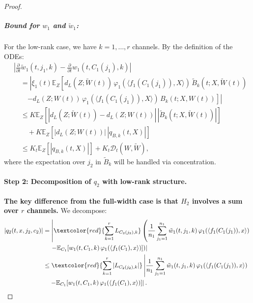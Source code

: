 \begin{proof}
\subparagraph*{Bound for $w_1$ and $\tilde{w}_1$:}
For the low-rank case, we have $k = 1, \ldots, r$ channels. By the definition of the ODEs:
\begin{align*}
&\left|\frac{\partial}{\partial t}\tilde{w}_1(t, j_1, k) - \frac{\partial}{\partial t}w_1(t, C_1(j_1), k)\right|\\
&\quad = \left|\xi_1(t)\mathbb{E}_Z\left[d_L(Z; \tilde{W}(t))\,\varphi_1(\langle f_1(C_1(j_1)), X\rangle)\,\tilde{B}_k(t; X, \tilde{W}(t))\right.\right.\\
&\quad\quad\left.\left. - d_L(Z; W(t))\,\varphi_1(\langle f_1(C_1(j_1)), X\rangle)\,B_k(t; X, W(t))\right]\right|\\
&\quad \le K\mathbb{E}_Z\left[|d_L(Z; \tilde{W}(t)) - d_L(Z; W(t))|\,|\tilde{B}_k(t; X, \tilde{W}(t))|\right]\\
&\quad\quad + K\mathbb{E}_Z\left[|d_L(Z; W(t))|\,|q_{B,k}(t, X)|\right]\\
&\quad \le K_t\mathbb{E}_Z\left[|q_{B,k}(t, X)|\right] + K_t\mathscr{D}_t(W, \tilde{W}),
\end{align*}
where the expectation over $j_2$ in $\tilde{B}_k$ will be handled via concentration.

\paragraph*{Step 2: Decomposition of $q_2$ with low-rank structure.}

\textbf{The key difference from the full-width case is that $H_2$ involves a sum over $r$ channels.} We decompose:
\begin{align*}
|q_2(t, x, j_2, c_2)| &= \left|\textcolor{red}{\sum_{k=1}^r L_{C_2(j_2),k}}\left(\frac{1}{n_1}\sum_{j_1=1}^{n_1}\tilde{w}_1(t, j_1, k)\,\varphi_1(\langle f_1(C_1(j_1)), x\rangle)\right.\right.\\
&\quad\left.\left. - \mathbb{E}_{C_1}[w_1(t, C_1, k)\,\varphi_1(\langle f_1(C_1), x\rangle)]\right)\right|\\
&\le \textcolor{red}{\sum_{k=1}^r |L_{C_2(j_2),k}|}\left|\frac{1}{n_1}\sum_{j_1=1}^{n_1}\tilde{w}_1(t, j_1, k)\,\varphi_1(\langle f_1(C_1(j_1)), x\rangle)\right.\\
&\quad\left. - \mathbb{E}_{C_1}[w_1(t, C_1, k)\,\varphi_1(\langle f_1(C_1), x\rangle)]\right|.
\end{align*}


\end{proof}
